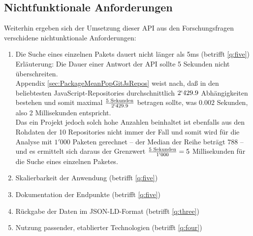 \subsection{Nichtfunktionale Anforderungen} \label{sec:N_Anforderungen}
    Weiterhin ergeben sich der Umsetzung dieser \ac{API} aus den Forschungsfragen verschidene nichtunktionale Anforderungen:
    \begin{enumerate}[label=\textbf{NFRQ-\Roman*}, leftmargin=2.5cm]
        \item Die Suche eines einzelnen Pakets dauert nicht länger als 5ms (betrifft \ref{q:five}) \label{nf:one}
        \\
        Erläuterung:
        Die Dauer einer Antwort der API sollte 5 Sekunden nicht überschreiten.\textsuperscript{\cite{link:ApiResponseTime}}
        \\
        Appendix \ref{sec:PackageMeanPopGitJsRepos} weist nach, daß in den beliebtesten JavaScript-Repositories durchschnittlich $2`429.9$ Abhängigkeiten bestehen und somit maximal $\frac{5\text{ Sekunden}}{2`429.9}$ betragen sollte, was $0.002$ Sekunden, also 2 Millisekunden entspricht.
        \\
        Das ein Projekt jedoch solch hohe Anzahlen beinhaltet ist ebenfalls aus den Rohdaten der 10 Repositories nicht immer der Fall und somit wird für die Analyse mit $1'000$ Paketen gerechnet -- der Median der Reihe beträgt $788$ -- und es ermittelt sich daraus der Grenzwert $\frac{5\text{ Sekunden}}{1`000} = 5$ Millisekunden für die Suche eines einzelnen Paketes.
        \item Skalierbarkeit der Anwendung (betrifft \ref{q:five}) \label{nf:two}
        \item Dokumentation der Endpunkte (betrifft \ref{q:five}) \label{nf:three}
        \item Rückgabe der Daten im \acs{JSON-LD}-Format (betrifft \ref{q:three}) \label{nf:four}
        \item Nutzung passender, etablierter Technologien (betrifft \ref{q:four}) \label{nf:five}
    \end{enumerate}